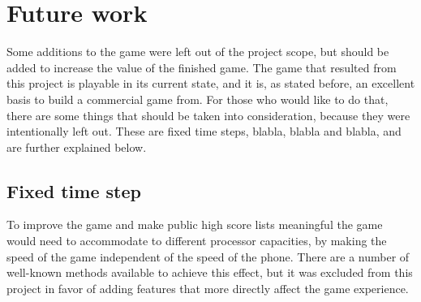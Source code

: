 \chapter{Future work}

Some additions to the game were left out of the project scope, but should be added to increase the value of the finished game. The game that resulted from this project is playable in its current state, and it is, as stated before, an excellent basis to build a commercial game from. For those who would like to do that, there are some things that should be taken into consideration, because they were intentionally left out. These are fixed time steps, blabla, blabla and blabla, and are further explained below.

\section{Fixed time step}

To improve the game and make public high score lists meaningful the game would need to accommodate to different processor capacities, by making the speed of the game independent of the speed of the phone. There are a number of well-known methods available to achieve this effect, but it was excluded from this project in favor of adding features that more directly affect the game experience. 